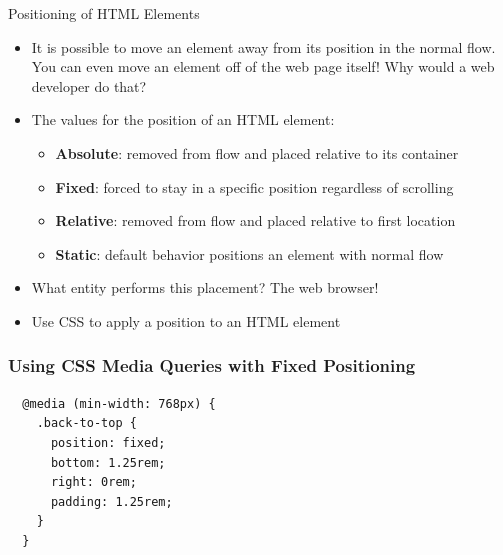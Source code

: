 \documentclass[14pt,aspectratio=169]{beamer}
\begin{document}
%
\begin{frame}{Positioning of HTML Elements}
  \begin{itemize}
    \item It is possible to move an element away from its position in the normal
      flow. You can even move an element off of the web page itself! Why would
      a web developer do that?
      \vspace*{-.15in}
    \item The values for the position of an HTML element:
      \begin{itemize}
        \item {\bf Absolute}: removed from flow and placed relative to its
          container
        \item {\bf Fixed}: forced to stay in a specific position regardless of
          scrolling
        \item {\bf Relative}: removed from flow and placed relative to first
          location
        \item {\bf Static}: default behavior positions an element with
          normal flow
      \end{itemize}
      \vspace*{-.2in}
    \item What entity performs this placement? The web browser!
      \vspace*{-.2in}
    \item Use CSS to apply a position to an HTML element
  \end{itemize}
\end{frame}

%
\begin{frame}[fragile]
  \frametitle{Using CSS Media Queries with Fixed Positioning}
  \normalsize
  \begin{minipage}{6in}
    \vspace*{.1in}
    \begin{verbatim}
  @media (min-width: 768px) {
    .back-to-top {
      position: fixed;
      bottom: 1.25rem;
      right: 0rem;
      padding: 1.25rem;
    }
  }
    \end{verbatim}
  \end{minipage}
%
\end{frame}
\end{document}
